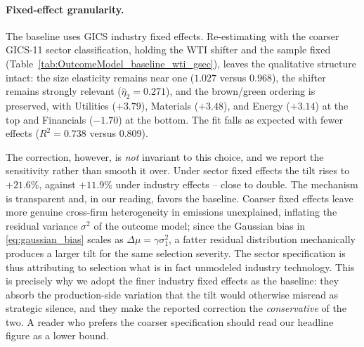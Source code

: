 \documentclass[a4paper,12pt]{article}
\begin{document}
\paragraph{Fixed-effect granularity.} The baseline uses GICS industry fixed effects. Re-estimating with the coarser GICS-11 sector classification, holding the WTI shifter and the sample fixed (Table~\ref{tab:OutcomeModel_baseline_wti_gsec}), leaves the qualitative structure intact: the size elasticity remains near one ($1.027$ versus $0.968$), the shifter remains strongly relevant ($\hat\eta_2 = 0.271$), and the brown/green ordering is preserved, with Utilities ($+3.79$), Materials ($+3.48$), and Energy ($+3.14$) at the top and Financials ($-1.70$) at the bottom. The fit falls as expected with fewer effects ($R^2 = 0.738$ versus $0.809$).

The correction, however, is \emph{not} invariant to this choice, and we report the sensitivity rather than smooth it over. Under sector fixed effects the tilt rises to $+21.6\%$, against $+11.9\%$ under industry effects -- close to double. The mechanism is transparent and, in our reading, favors the baseline. Coarser fixed effects leave more genuine cross-firm heterogeneity in emissions unexplained, inflating the residual variance $\sigma^2$ of the outcome model; since the Gaussian bias in \eqref{eq:gaussian_bias} scales as $\Delta\mu = \gamma\sigma_1^2$, a fatter residual distribution mechanically produces a larger tilt for the same selection severity. The sector specification is thus attributing to selection what is in fact unmodeled industry technology. This is precisely why we adopt the finer industry fixed effects as the baseline: they absorb the production-side variation that the tilt would otherwise misread as strategic silence, and they make the reported correction the \emph{conservative} of the two. A reader who prefers the coarser specification should read our headline figure as a lower bound.
\end{document}
